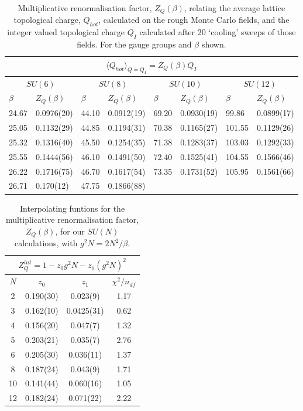 \documentclass[12pt]{article}
\begin{document}
\begin{table}[htb]
\centering
\begin{tabular}{|ll|ll|ll|ll|} \hline
\multicolumn{8}{|c|}{$\langle{Q}_{hot}\rangle_{Q=Q_I} = Z_Q(\beta) Q_I$} \\ \hline
\multicolumn{2}{|c|}{$SU(6)$} &\multicolumn{2}{|c|}{$SU(8)$} & \multicolumn{2}{|c|}{$SU(10)$} & \multicolumn{2}{|c|}{$SU(12)$} \\ \hline
$\beta$ & $Z_Q(\beta)$ & $\beta$ & $Z_Q(\beta)$ & $\beta$ & $Z_Q(\beta)$ & $\beta$ & $Z_Q(\beta)$  \\ \hline
24.67 & 0.0976(20) & 44.10  & 0.0912(19)  & 69.20 & 0.0930(19) & 99.86  & 0.0899(17) \\
25.05 & 0.1132(29) & 44.85  & 0.1194(31)  & 70.38 & 0.1165(27) & 101.55 & 0.1129(26) \\
25.32 & 0.1316(40) & 45.50  & 0.1254(35)  & 71.38 & 0.1283(37) & 103.03 & 0.1292(33) \\
25.55 & 0.1444(56) & 46.10  & 0.1491(50)  & 72.40 & 0.1525(41) & 104.55 & 0.1566(46) \\
26.22 & 0.1716(75) & 46.70  & 0.1617(54)  & 73.35 & 0.1731(52) & 105.95 & 0.1561(66) \\
26.71 & 0.170(12)  & 47.75  & 0.1866(88)  &  &  &  & \\ \hline
\end{tabular}
\caption{Multiplicative renormalisation factor, $Z_Q(\beta)$, relating 
  the average lattice topological charge, $Q_{hot}$,  calculated on the rough
  Monte Carlo fields, and the integer valued topological charge $Q_I$ calculated
  after 20 `cooling' sweeps of those fields. For the gauge groups and $\beta$ shown.}
\label{table_ZQB}
\end{table}



\begin{table}[htb]
\centering
\begin{tabular}{|c|c|c|c|} \hline
\multicolumn{4}{|c|}{$Z^{int}_Q = 1 - z_0 g^2N - z_1 (g^2N)^2$} \\ \hline
$N$ & $z_0$ & $z_1$ & $\chi^2/n_{df}$ \\ \hline
 2 & 0.190(30) & 0.023(9)   & 1.17  \\
 3 & 0.162(10) & 0.0425(31) & 0.62  \\
 4 & 0.156(20) & 0.047(7)   & 1.32  \\
 5 & 0.203(21) & 0.035(7)   & 2.76  \\
 6 & 0.205(30) & 0.036(11)  & 1.37  \\
 8  & 0.187(24) & 0.043(9)   & 1.71   \\
 10 & 0.141(44) & 0.060(16)  & 1.05 \\
 12 & 0.182(24) & 0.071(22)  & 2.22 \\ \hline
\end{tabular}
\caption{Interpolating funtions for the multiplicative renormalisation factor, $Z_Q(\beta)$,
  for our $SU(N)$ calculations, with $g^2N=2N^2/\beta$.}
\label{table_ZQint}
\end{table}
\end{document}

